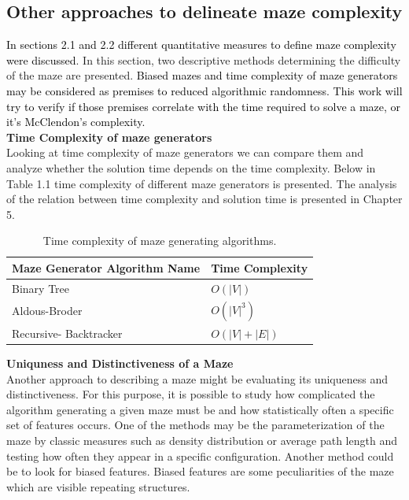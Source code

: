 \subsection{Other approaches to delineate maze complexity }
\textcolor{black}{In sections 2.1 and 2.2 different quantitative measures to define maze complexity were discussed}. In this section, two descriptive methods determining the difficulty of the maze are presented.\textcolor{black}{ Biased mazes and time complexity of maze generators may be considered as premises to reduced algorithmic randomness. This work will try to verify if those premises correlate with the time required to solve a maze, or it's McClendon’s complexity. } \\ \newline
\textbf{Time Complexity of maze generators}\\
Looking at time complexity of maze generators we can compare them and analyze whether the solution time depends on the time complexity. Below in Table 1.1 time complexity of different maze generators is presented. The analysis of the relation between time complexity and solution time is presented in Chapter 5.\\
\begin{table}[!h]
\begin{center} 
\begin{tabular}{ |p{6cm}||p{3cm}| } 
\hline Maze Generator Algorithm Name& Time Complexity\\ \hline Binary Tree\cite{Cormen} & $O(|V|)$\\ Aldous-Broder\cite{Nunes}& $O(|V|^3)$ \\ 
Recursive- Backtracker\cite[Puntambekar]& $O(|V|+|E|)$\\ 
\hline
 \end{tabular} 
\caption{\label{tab:table-name}Time complexity of maze generating algorithms.} 
\end{center}
 \end{table}
 \newline
 \newline
\textbf{Uniquness and Distinctiveness of a Maze}\\
Another approach to describing a maze might be evaluating its uniqueness and distinctiveness. For this purpose, it is possible to study how complicated the algorithm generating a given maze must be and how statistically often a specific set of features occurs. One of the methods may be the parameterization of the maze by classic measures such as density distribution or average path length and testing how often they appear in a specific configuration. Another method could be to look for biased features. Biased features are some peculiarities of the maze which are visible repeating structures.
